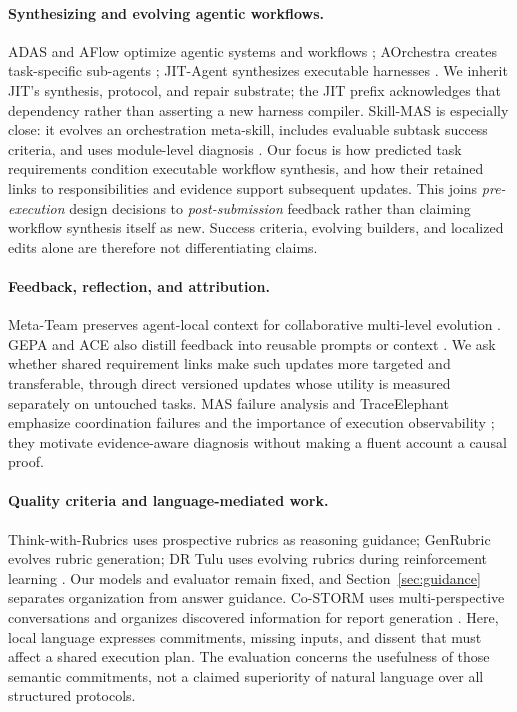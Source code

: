 \documentclass[11pt]{article}
\begin{document}
\paragraph{Synthesizing and evolving agentic workflows.}
ADAS and AFlow optimize agentic systems and workflows \citep{hu2024adas,zhang2024aflow}; AOrchestra creates task-specific sub-agents \citep{ruan2026aorchestra}; JIT-Agent synthesizes executable harnesses \citep{zhang2026jit}. We inherit JIT's synthesis, protocol, and repair substrate; the JIT prefix acknowledges that dependency rather than asserting a new harness compiler. Skill-MAS is especially close: it evolves an orchestration meta-skill, includes evaluable subtask success criteria, and uses module-level diagnosis \citep{lin2026skillmas}. Our focus is how predicted task requirements condition executable workflow synthesis, and how their retained links to responsibilities and evidence support subsequent updates. This joins \emph{pre-execution} design decisions to \emph{post-submission} feedback rather than claiming workflow synthesis itself as new. Success criteria, evolving builders, and localized edits alone are therefore not differentiating claims.

\paragraph{Feedback, reflection, and attribution.}
Meta-Team preserves agent-local context for collaborative multi-level evolution \citep{hao2026metateam}. GEPA and ACE also distill feedback into reusable prompts or context \citep{agrawal2025gepa,zhang2025ace}. We ask whether shared requirement links make such updates more targeted and transferable, through direct versioned updates whose utility is measured separately on untouched tasks. MAS failure analysis and TraceElephant emphasize coordination failures and the importance of execution observability \citep{cemri2025fail,chen2026elephant}; they motivate evidence-aware diagnosis without making a fluent account a causal proof.

\paragraph{Quality criteria and language-mediated work.}
Think-with-Rubrics uses prospective rubrics as reasoning guidance; GenRubric evolves rubric generation; DR Tulu uses evolving rubrics during reinforcement learning \citep{yu2026thinkrubrics,chen2026genrubric,shao2025drtulu}. Our models and evaluator remain fixed, and Section~\ref{sec:guidance} separates organization from answer guidance. Co-STORM uses multi-perspective conversations and organizes discovered information for report generation \citep{jiang2024costorm}. Here, local language expresses commitments, missing inputs, and dissent that must affect a shared execution plan. The evaluation concerns the usefulness of those semantic commitments, not a claimed superiority of natural language over all structured protocols.
\end{document}

